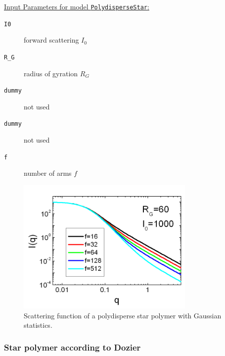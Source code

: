 \vspace{5mm}

\noindent
\underline{Input Parameters for model \texttt{PolydisperseStar}:}
\begin{description}
\item[\texttt{I0}] forward scattering $I_0$
\item[\texttt{R\_G}] radius of gyration $R_G$
\item[\texttt{dummy}] not used
\item[\texttt{dummy}] not used
\item[\texttt{f}] number of arms $f$
\end{description}


\begin{figure}[htb]
\begin{center}
\includegraphics[width=0.768\textwidth,height=0.588\textwidth]{polyBenoit_Iq.png}
\end{center}
\caption{Scattering function of a polydisperse star polymer with Gaussian statistics.} \label{fig:polyBenoit_Iq}
\end{figure}



\clearpage
\subsubsection{Star polymer according to Dozier}
\label{sect:DozierStar}
~\\
